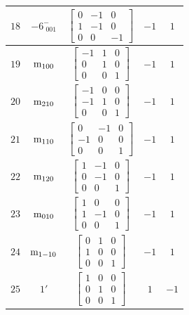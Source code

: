 \documentclass[fleqn,8pt]{jsarticle}
\begin{document}
\begin{longtable}{ccccc}
$ 18 $ & $ -6^{-}_{\,\,001} $ & $ \begin{bmatrix} 0 & -1 & 0 \\ 1 & -1 & 0 \\ 0 & 0 & -1 \end{bmatrix} $ & $ -1 $ & $ 1 $ \\ \hline
$ 19 $ & $ {\rm m}_{100} $ & $ \begin{bmatrix} -1 & 1 & 0 \\ 0 & 1 & 0 \\ 0 & 0 & 1 \end{bmatrix} $ & $ -1 $ & $ 1 $ \\ \hline
$ 20 $ & $ {\rm m}_{210} $ & $ \begin{bmatrix} -1 & 0 & 0 \\ -1 & 1 & 0 \\ 0 & 0 & 1 \end{bmatrix} $ & $ -1 $ & $ 1 $ \\ \hline
$ 21 $ & $ {\rm m}_{110} $ & $ \begin{bmatrix} 0 & -1 & 0 \\ -1 & 0 & 0 \\ 0 & 0 & 1 \end{bmatrix} $ & $ -1 $ & $ 1 $ \\ \hline
$ 22 $ & $ {\rm m}_{120} $ & $ \begin{bmatrix} 1 & -1 & 0 \\ 0 & -1 & 0 \\ 0 & 0 & 1 \end{bmatrix} $ & $ -1 $ & $ 1 $ \\ \hline
$ 23 $ & $ {\rm m}_{010} $ & $ \begin{bmatrix} 1 & 0 & 0 \\ 1 & -1 & 0 \\ 0 & 0 & 1 \end{bmatrix} $ & $ -1 $ & $ 1 $ \\ \hline
$ 24 $ & $ {\rm m}_{1-10} $ & $ \begin{bmatrix} 0 & 1 & 0 \\ 1 & 0 & 0 \\ 0 & 0 & 1 \end{bmatrix} $ & $ -1 $ & $ 1 $ \\ \hline
$ 25 $ & $ 1{}' $ & $ \begin{bmatrix} 1 & 0 & 0 \\ 0 & 1 & 0 \\ 0 & 0 & 1 \end{bmatrix} $ & $ 1 $ & $ -1 $ \\ \hline

\end{longtable}
\end{document}
